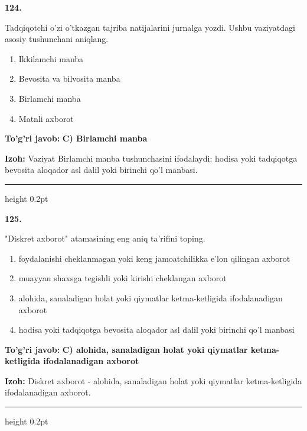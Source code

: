 \documentclass[10pt,a4paper,oneside]{article}
\begin{document}
\noindent\textbf{\color{ink}124.}
\par
Tadqiqotchi o'zi o'tkazgan tajriba natijalarini jurnalga yozdi. Ushbu vaziyatdagi asosiy tushunchani aniqlang.
\begin{enumerate}[label=\Alph*),leftmargin=9mm]
\item Ikkilamchi manba
\item Bevosita va bilvosita manba
\item Birlamchi manba
\item Matnli axborot
\end{enumerate}
\begin{tcolorbox}[enhanced,breakable,colback=teal!4,colframe=teal!50!black,boxrule=0.5pt,arc=1.1mm,left=3mm,right=3mm,top=1.7mm,bottom=1.7mm,before skip=2mm,after skip=2mm]
\textbf{\color{teal}To'g'ri javob:} \textbf{C) Birlamchi manba}
\par\smallskip
\textbf{Izoh:} Vaziyat Birlamchi manba tushunchasini ifodalaydi: hodisa yoki tadqiqotga bevosita aloqador asl dalil yoki birinchi qo'l manbasi.
\end{tcolorbox}
\vspace{2mm}\hrule height 0.2pt \vspace{3mm}

\noindent\textbf{\color{ink}125.}
\par
"Diskret axborot" atamasining eng aniq ta'rifini toping.
\begin{enumerate}[label=\Alph*),leftmargin=9mm]
\item foydalanishi cheklanmagan yoki keng jamoatchilikka e'lon qilingan axborot
\item muayyan shaxsga tegishli yoki kirishi cheklangan axborot
\item alohida, sanaladigan holat yoki qiymatlar ketma-ketligida ifodalanadigan axborot
\item hodisa yoki tadqiqotga bevosita aloqador asl dalil yoki birinchi qo'l manbasi
\end{enumerate}
\begin{tcolorbox}[enhanced,breakable,colback=teal!4,colframe=teal!50!black,boxrule=0.5pt,arc=1.1mm,left=3mm,right=3mm,top=1.7mm,bottom=1.7mm,before skip=2mm,after skip=2mm]
\textbf{\color{teal}To'g'ri javob:} \textbf{C) alohida, sanaladigan holat yoki qiymatlar ketma-ketligida ifodalanadigan axborot}
\par\smallskip
\textbf{Izoh:} Diskret axborot - alohida, sanaladigan holat yoki qiymatlar ketma-ketligida ifodalanadigan axborot.
\end{tcolorbox}
\vspace{2mm}\hrule height 0.2pt \vspace{3mm}
\end{document}
